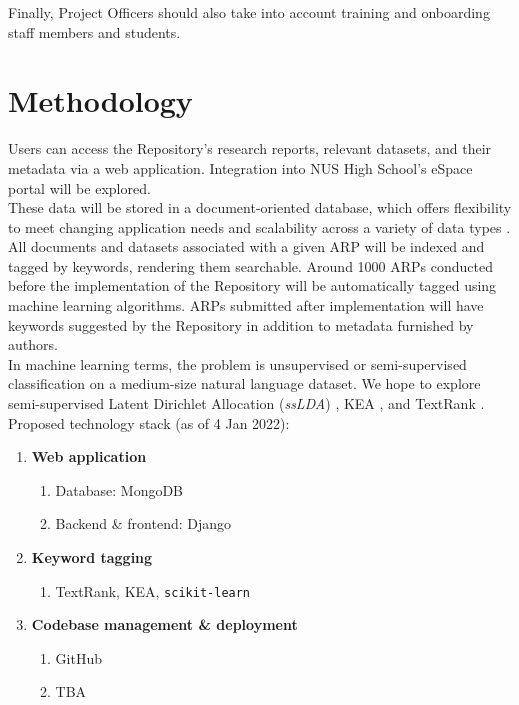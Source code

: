 \documentclass{article}
\begin{document}
Finally, Project Officers should also take into account training and onboarding staff members and students.

\section{Methodology}

Users can access the Repository’s research reports, relevant datasets, and their metadata via a web application. Integration into NUS High School’s eSpace portal will be explored. \\

These data will be stored in a document-oriented database, which offers flexibility to meet changing application needs and scalability across a variety of data types \parencite{mongodb_document_nodate}. \\

All documents and datasets associated with a given ARP will be indexed and tagged by keywords, rendering them searchable. Around 1000 ARPs conducted before the implementation of the Repository will be automatically tagged using machine learning algorithms. ARPs submitted after implementation will have keywords suggested by the Repository in addition to metadata furnished by authors. \\

In machine learning terms, the problem is unsupervised or semi-supervised classification on a medium-size natural language dataset. We hope to explore semi-supervised Latent Dirichlet Allocation (\textit{ssLDA}) \parencite{wang_semi-supervised_2012}, KEA \parencite{witten_kea_2005}, and TextRank \parencite{mihalcea_textrank_2004}. \\

Proposed technology stack (as of 4 Jan 2022):

\begin{enumerate}[label=\alph*)]
    \item \textbf{Web application}
    \begin{enumerate}[label=\roman*.]
        \item Database: MongoDB
        \item Backend \& frontend: Django
    \end{enumerate}
    \item \textbf{Keyword tagging}
    \begin{enumerate}[label={}]
        \item TextRank, KEA, \texttt{scikit-learn}
    \end{enumerate}
    \item \textbf{Codebase management \& deployment}
    \begin{enumerate}[label=\roman*.]
        \item GitHub
        \item TBA
    \end{enumerate}
\end{enumerate}
\end{document}
